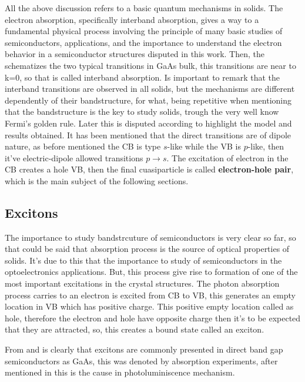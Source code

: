 All the above discussion refers to a basic quantum mechanisms in solids. The electron absorption, specifically interband absorption, gives a way to a fundamental physical process  involving the principle of many basic studies of semiconductors, applications, and the importance to understand the electron behavior in a semiconductor structures disputed in this work. Then, the  schematizes the two typical transitions in GaAs bulk, this transitions are near to k=0, so that is called interband absorption. Is important to remark that the interband transitions are observed in all solids, but the mechanisms are different dependently of their bandstructure, for what,  being repetitive when mentioning that the bandstructure is the key to study solids,  trough the very well know Fermi's golden rule. Later this is disputed according to highlight the model and results obtained. It has been mentioned that the direct transitions are of dipole nature, as before mentioned the CB is type $s$-like while the VB is $p$-like, then it've electric-dipole allowed transitions $p\to s$. The excitation of electron in the CB creates a hole VB, then the  final cuasiparticle is called \textbf{electron-hole pair}, which is the main subject of the following sections.


\subsection{Excitons}
\label{subsec:chapter-1-excitons}
\vspace{-10mm}
The importance to study bandstrcuture of semiconductors is very clear so far, so that could be said that absorption process is the source of optical properties of solids. It's due to this that the importance to study of semiconductors in the optoelectronics applications. But, this process give rise to formation of one of the most important excitations in the crystal structures. The photon absorption process carries to an electron is excited from CB to VB, this  generates an empty location in VB which has positive charge. This positive empty location called as hole, therefore the electron and hole have opposite charge then it's  to be expected that they are attracted, so, this creates a bound state called an exciton\cite{leonard2017exciton}. 

From  and   is clearly that excitons are commonly presented in direct band gap semiconductors as GaAs, this was denoted by absorption experiments,  after mentioned in  this is the cause in photoluminiscence mechanism.

